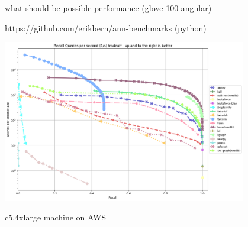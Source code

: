\documentclass[xcolor=dvipsnames, aspectratio=1610]{beamer}
\begin{document}
\begin{frame}{what should be possible performance (glove-100-angular)} 
\linespread{1}\Large{
\begin{minipage}{0.99\textwidth}  
https://github.com/erikbern/ann-benchmarks (python)

\includegraphics[width=0.8\textwidth]{Figures/perf_comp.png}

c5.4xlarge machine on AWS
\end{minipage}
}
\end{frame}
\end{document}
